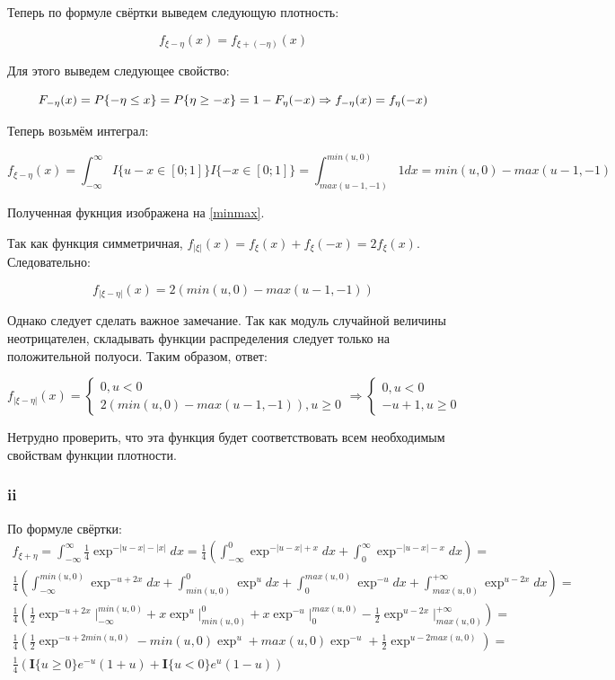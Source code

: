 \documentclass[a4paper,12pt]{article}
\def \mbf{\mathbf}
\def \I{\mbf{I}}
\begin{document}
Теперь по формуле свёртки выведем следующую плотность:

\[ f_{\xi - \eta}(x) = f_{\xi + (-\eta)}(x) \]

Для этого выведем следующее свойство:


\[  F_{-\eta}(x) = P\{-\eta \le x\} = P\{\eta \ge -x\} =\\ 1 -F_{\eta}(-x) \Rightarrow f_{-\eta}(x) = f_{\eta}(-x) \] 

Теперь возьмём интеграл:


\[  f_{\xi - \eta}(x) = \int_{-\infty}^{\infty} I\{u - x \in [0;1]\} I\{- x \in [0;1]\} = \int_{max(u-1,-1)}^{min(u,0)}1 dx = min(u,0) - max(u-1,-1) \]

Полученная фукнция изображена на \ref{minmax}.

Так как функция симметричная, $ f_{|\xi|}(x) = f_\xi(x) + f_\xi(-x) = 2 f_\xi(x) $. Следовательно: 

\[  f_{|\xi - \eta|}(x) = 2(min(u,0) - max(u-1,-1))  \]

Однако следует сделать важное замечание. Так как модуль случайной величины неотрицателен, складывать функции распределения следует только на положительной полуоси. Таким образом, ответ:

\[  f_{|\xi - \eta|}(x) = 
\begin{cases}
0, u < 0\\
2(min(u,0) - max(u-1,-1)), u \ge 0
\end{cases} \Rightarrow \begin{cases}
0, u < 0\\
-u + 1, u \ge 0
\end{cases}
\]

Нетрудно проверить, что эта функция будет соответствовать всем необходимым свойствам функции плотности.


\subsubsection{ii}

По формуле свёртки:
\begin{equation*}
\begin{aligned}
f_{\xi + \eta} = \int_{-\infty}^{\infty} \frac{1}{4} \exp^{-|u-x|-|x|} dx=  \frac{1}{4}  \left( \int_{-\infty}^{0} \exp^{-|u-x|+x} dx + \int_{0}^{\infty}  \exp^{-|u-x|-x} dx \right) = \\ \frac{1}{4} \left( \int_{-\infty}^{min(u,0)} \exp^{-u+2x} dx+ \int_{min(u,0)}^{0} \exp^{u} dx+ \int_{0}^{max(u,0)}  \exp^{-u} dx + \int_{max(u,0)}^{+\infty}  \exp^{u-2x} dx \right) = \\
\frac{1}{4} \left( \frac{1}{2}\exp^{-u+2x} \Biggr|_{-\infty}^{min(u,0)}  + x \exp^u \Biggr|_{min(u,0)}^{0} + x \exp^{-u} \Biggr|_{0}^{max(u, 0)}  - \frac{1}{2} \exp^{u-2x} \Biggr|_{max(u, 0)}^{+\infty} \right) = \\
\frac{1}{4} \left( \frac{1}{2}\exp^{-u+2min(u,0)} - min(u,0) \exp^u + max(u,0) \exp^{-u} + \frac{1}{2} \exp^{u-2max(u, 0)} \right) =\\ \frac{1}{4} \left( \I\{u \ge 0\} e^{-u}(1+u) + \I\{u < 0\} e^{u}(1-u) \right)
\end{aligned}
\end{equation*}
\end{document}
